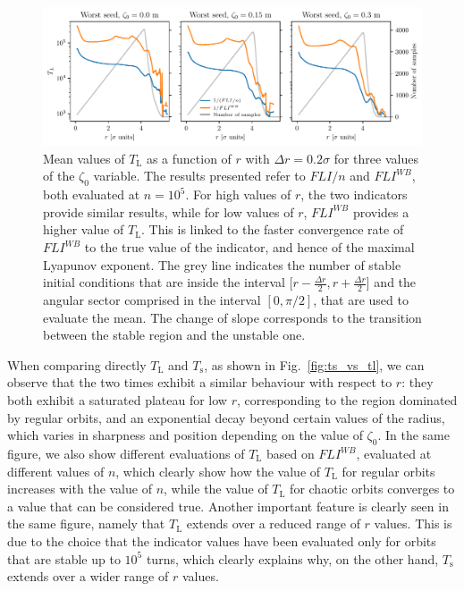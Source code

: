 \begin{figure}
    \centering
    \includegraphics[width=1\textwidth]{6_lhc_dynamic_indicators/figs/updated/lyapunov_time_vs_lyapunov_wb_time.pdf}
    \caption{Mean values of $T_\mathrm{L}$ as a function of $r$ with $\Delta r = 0.2\sigma$ for three values of the $\zeta_0$ variable. The results presented refer to $FLI/n$ and $FLI^{{WB}}$, both evaluated at $n=10^5$. For high values of $r$, the two indicators provide similar results, while for low values of $r$, $FLI^{{WB}}$ provides a higher value of $T_\mathrm{L}$. This is linked to the faster convergence rate of $FLI^{{WB}}$ to the true value of the indicator, and hence of the maximal Lyapunov exponent. The grey line indicates the number of stable initial conditions that are inside the interval [$r-\frac{\Delta r}{2}, r+\frac{\Delta r}{2}$] and the angular sector comprised in the interval $[0,\pi/2]$, that are used to evaluate the mean. The change of slope corresponds to the transition between the stable region and the unstable one.}
    \label{fig:lyapunov_time_fli_vs_wb}
\end{figure}

When comparing directly $T_\mathrm{L}$ and $T_\mathrm{s}$, as shown in Fig.~\ref{fig:ts_vs_tl}, we can observe that the two times exhibit a similar behaviour with respect to $r$: they both exhibit a saturated plateau for low $r$, corresponding to the region dominated by regular orbits, and an exponential decay beyond certain values of the radius, which varies in sharpness and position depending on the value of $\zeta_0$. In the same figure, we also show different evaluations of $T_\mathrm{L}$ based on $FLI^{WB}$, evaluated at different values of $n$, which clearly show how the value of $T_\mathrm{L}$ for regular orbits increases with the value of $n$, while the value of $T_\mathrm{L}$ for chaotic orbits converges to a value that can be considered true. Another important feature is clearly seen in the same figure, namely that $T_\mathrm{L}$ extends over a reduced range of $r$ values. This is due to the choice that the indicator values have been evaluated only for orbits that are stable up to $10^5$ turns, which clearly explains why, on the other hand, $T_\mathrm{s}$ extends over a wider range of $r$ values. 

